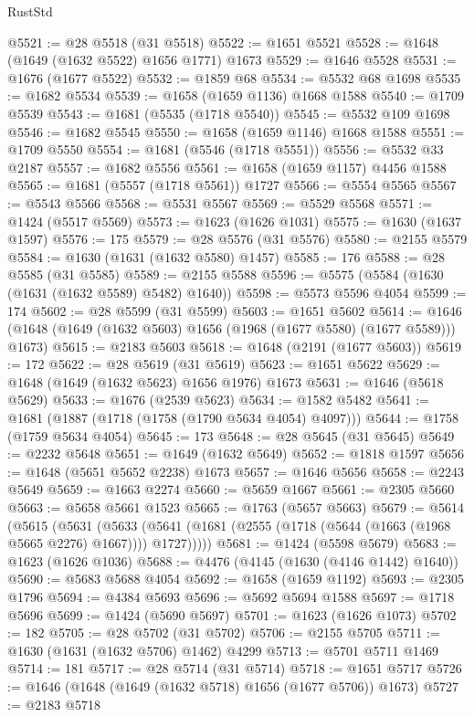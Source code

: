 \begin{lexlean}{RustStd}
\begin{coremodule}
{\begin{coremodule}
{{{{{{{{{{{{{{{{{{{{{{{{{{{{{{{{{{{{{{{{{{{{@5521 := @28 @5518 (@31 @5518)
@5522 := @1651 @5521
@5528 := @1648 (@1649 (@1632 @5522) @1656 @1771) @1673
@5529 := @1646 @5528
@5531 := @1676 (@1677 @5522)
@5532 := @1859 @68
@5534 := @5532 @68 @1698
@5535 := @1682 @5534
@5539 := @1658 (@1659 @1136) @1668 @1588
@5540 := @1709 @5539
@5543 := @1681 (@5535 (@1718 @5540))
@5545 := @5532 @109 @1698
@5546 := @1682 @5545
@5550 := @1658 (@1659 @1146) @1668 @1588
@5551 := @1709 @5550
@5554 := @1681 (@5546 (@1718 @5551))
@5556 := @5532 @33 @2187
@5557 := @1682 @5556
@5561 := @1658 (@1659 @1157) @4456 @1588
@5565 := @1681 (@5557 (@1718 @5561)) @1727
@5566 := @5554 @5565
@5567 := @5543 @5566
@5568 := @5531 @5567
@5569 := @5529 @5568
@5571 := @1424 (@5517 @5569)
@5573 := @1623 (@1626 @1031)
@5575 := @1630 (@1637 @1597)
@5576 := 175
@5579 := @28 @5576 (@31 @5576)
@5580 := @2155 @5579
@5584 := @1630 (@1631 (@1632 @5580) @1457)
@5585 := 176
@5588 := @28 @5585 (@31 @5585)
@5589 := @2155 @5588
@5596 := @5575 (@5584 (@1630 (@1631 (@1632 @5589) @5482) @1640))
@5598 := @5573 @5596 @4054
@5599 := 174
@5602 := @28 @5599 (@31 @5599)
@5603 := @1651 @5602
@5614 := @1646 (@1648 (@1649 (@1632 @5603) @1656 (@1968 (@1677 @5580) (@1677 @5589))) @1673)
@5615 := @2183 @5603
@5618 := @1648 (@2191 (@1677 @5603))
@5619 := 172
@5622 := @28 @5619 (@31 @5619)
@5623 := @1651 @5622
@5629 := @1648 (@1649 (@1632 @5623) @1656 @1976) @1673
@5631 := @1646 (@5618 @5629)
@5633 := @1676 (@2539 @5623)
@5634 := @1582 @5482
@5641 := @1681 (@1887 (@1718 (@1758 (@1790 @5634 @4054) @4097)))
@5644 := @1758 (@1759 @5634 @4054)
@5645 := 173
@5648 := @28 @5645 (@31 @5645)
@5649 := @2232 @5648
@5651 := @1649 (@1632 @5649)
@5652 := @1818 @1597
@5656 := @1648 (@5651 @5652 @2238) @1673
@5657 := @1646 @5656
@5658 := @2243 @5649
@5659 := @1663 @2274
@5660 := @5659 @1667
@5661 := @2305 @5660
@5663 := @5658 @5661 @1523
@5665 := @1763 (@5657 @5663)
@5679 := @5614
    (@5615
      (@5631
        (@5633 (@5641 (@1681 (@2555 (@1718 (@5644 (@1663 (@1968 @5665 @2276) @1667)))) @1727)))))
@5681 := @1424 (@5598 @5679)
@5683 := @1623 (@1626 @1036)
@5688 := @4476 (@4145 (@1630 (@4146 @1442) @1640))
@5690 := @5683 @5688 @4054
@5692 := @1658 (@1659 @1192)
@5693 := @2305 @1796
@5694 := @4384 @5693
@5696 := @5692 @5694 @1588
@5697 := @1718 @5696
@5699 := @1424 (@5690 @5697)
@5701 := @1623 (@1626 @1073)
@5702 := 182
@5705 := @28 @5702 (@31 @5702)
@5706 := @2155 @5705
@5711 := @1630 (@1631 (@1632 @5706) @1462) @4299
@5713 := @5701 @5711 @1469
@5714 := 181
@5717 := @28 @5714 (@31 @5714)
@5718 := @1651 @5717
@5726 := @1646 (@1648 (@1649 (@1632 @5718) @1656 (@1677 @5706)) @1673)
@5727 := @2183 @5718
}}}}}}}}}}}}}}}}}}}}}}}}}}}}}}}}}}}}}}}}}}}}
\end{coremodule}}
\end{coremodule}
\end{lexlean}
